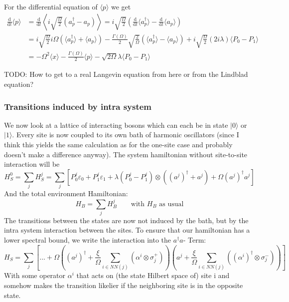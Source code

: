 	For the differential equation of $\langle p \rangle$ we get
	\begin{align}
		\frac{\text{d}}{\text{d}t} \langle p \rangle &= \frac{\text{d}}{\text{d}t} \left\langle i\sqrt{\frac{\Omega}{2}}(a_p^\dagger - a_p) \right\rangle =	i\sqrt{\frac{\Omega}{2}} \left(\frac{\text{d}}{\text{d}t} \langle a_p^\dagger \rangle - \frac{\text{d}}{\text{d}t} \langle a_p \rangle\right) \\
		&= i\sqrt{\frac{\Omega}{2}} i \Omega \left( \langle a_p^\dagger \rangle + \langle a_p \rangle \right) - \frac{\Gamma(\Omega)}{2} \sqrt{\frac{2}{\Omega}} \left( \langle a_p^\dagger \rangle - \langle a_p \rangle \right)  + i\sqrt{\frac{\Omega}{2}}  (2 i \lambda)  \langle P_0 - P_1 \rangle \\
		&= - \Omega^2 \langle x \rangle - \frac{\Gamma(\Omega)}{2}  \langle p \rangle - \sqrt{2 \Omega} \lambda \langle P_0 - P_1 \rangle
	\end{align}
	
	TODO:	How to get to a real Langevin equation from here or from the Lindblad equation?
	
	\subsubsection{Transitions induced by intra system    }
	
	We now look at a lattice of interacting bosons which can each be in state $|0\rangle$ or $|1 \rangle$. Every site is now coupled to its own bath of harmonic oscillators (since I think this yields the same calculation as for the one-site case and probably doesn't make a difference anyway). The system hamiltonian without site-to-site interaction will be
	\begin{equation}
		H_S^0 = \sum_{j}^{} H_S^j =	\sum_j 	\left[P_0^j \varepsilon_0 + P_1^j \varepsilon_1 + \lambda (P_0^j - P_1^j) \otimes ((a^j)^\dagger  + a^j) + \Omega (a^j)^\dagger a^j\right]
	\end{equation}
	And the total environment Hamiltonian:
	\begin{equation}
		H_B =	\sum_j H_B^j \qquad \text{with $H_B$ as usual}
	\end{equation}
	The transitions between the states are now not induced by the bath, but by the intra system interaction between the sites. To ensure that our hamiltonian has a lower spectral bound, we write the interaction into the $a^\dagger a$- Term:
	\begin{equation}
		H_S =	\sum_j 	\left[... + \Omega \left((a^j)^\dagger +  \frac{\xi}{\Omega} \sum_{i \in NN(j)}^{} \left( \alpha^i \otimes \sigma_j^+ \right) \right) \left(a^j + \frac{\xi}{\Omega} \sum_{i \in NN(j)}^{} \left( (\alpha^i)^\dagger \otimes \sigma_j^- \right) \right)\right]
	\end{equation}
	With some operator $\alpha^i$ that acts on (the state Hilbert space of) site i and somehow makes the transition likelier if the neighboring site is in the opposite state.
	
